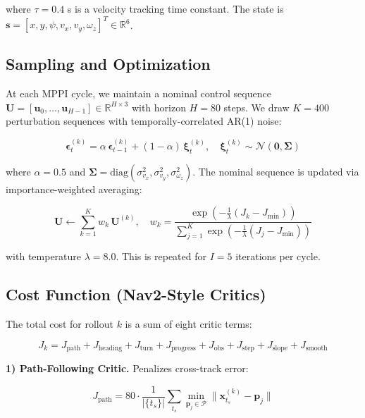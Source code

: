 \documentclass[11pt,a4paper]{article}
\begin{document}
where $\tau = 0.4$ s is a velocity tracking time constant. The state is $\mathbf{s} = [x, y, \psi, v_x, v_y, \omega_z]^T \in \mathbb{R}^6$.

\subsection{Sampling and Optimization}

At each MPPI cycle, we maintain a nominal control sequence $\mathbf{U} = [\mathbf{u}_0, \ldots, \mathbf{u}_{H-1}] \in \mathbb{R}^{H \times 3}$ with horizon $H = 80$ steps. We draw $K = 400$ perturbation sequences with temporally-correlated AR(1) noise:

\begin{equation}
\boldsymbol{\epsilon}^{(k)}_t = \alpha\,\boldsymbol{\epsilon}^{(k)}_{t-1} + (1 - \alpha)\,\boldsymbol{\xi}^{(k)}_t, \quad \boldsymbol{\xi}^{(k)}_t \sim \mathcal{N}(\mathbf{0}, \boldsymbol{\Sigma})
\end{equation}

where $\alpha = 0.5$ and $\boldsymbol{\Sigma} = \text{diag}(\sigma_{v_x}^2, \sigma_{v_y}^2, \sigma_{\omega_z}^2)$. The nominal sequence is updated via importance-weighted averaging:

\begin{equation}
\mathbf{U} \leftarrow \sum_{k=1}^{K} w_k\, \mathbf{U}^{(k)}, \quad w_k = \frac{\exp\left(-\frac{1}{\lambda}(J_k - J_{\min})\right)}{\sum_{j=1}^{K}\exp\left(-\frac{1}{\lambda}(J_j - J_{\min})\right)}
\end{equation}

with temperature $\lambda = 8.0$. This is repeated for $I = 5$ iterations per cycle.

\subsection{Cost Function (Nav2-Style Critics)}

The total cost for rollout $k$ is a sum of eight critic terms:

\begin{equation}
J_k = J_{\text{path}} + J_{\text{heading}} + J_{\text{turn}} + J_{\text{progress}} + J_{\text{obs}} + J_{\text{step}} + J_{\text{slope}} + J_{\text{smooth}}
\end{equation}

\textbf{1) Path-Following Critic.} Penalizes cross-track error:

\begin{equation}
J_{\text{path}} = 80 \cdot \frac{1}{|\{t_s\}|}\sum_{t_s} \min_{\mathbf{p}_j \in \mathcal{P}} \|\mathbf{x}^{(k)}_{t_s} - \mathbf{p}_j\|
\end{equation}
\end{document}
